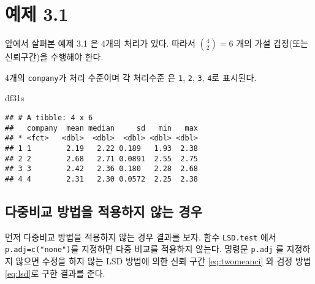 \documentclass[
]{book}
\newenvironment{Shaded}{\begin{snugshade}}{\end{snugshade}}
\newcommand{\AttributeTok}[1]{\textcolor[rgb]{0.77,0.63,0.00}{#1}}
\newcommand{\CommentTok}[1]{\textcolor[rgb]{0.56,0.35,0.01}{\textit{#1}}}
\newcommand{\ConstantTok}[1]{\textcolor[rgb]{0.00,0.00,0.00}{#1}}
\newcommand{\FloatTok}[1]{\textcolor[rgb]{0.00,0.00,0.81}{#1}}
\newcommand{\FunctionTok}[1]{\textcolor[rgb]{0.00,0.00,0.00}{#1}}
\newcommand{\NormalTok}[1]{#1}
\newcommand{\OtherTok}[1]{\textcolor[rgb]{0.56,0.35,0.01}{#1}}
\newcommand{\SpecialCharTok}[1]{\textcolor[rgb]{0.00,0.00,0.00}{#1}}
\newcommand{\StringTok}[1]{\textcolor[rgb]{0.31,0.60,0.02}{#1}}
\begin{document}
\hypertarget{uxc608uxc81c-3.1-1}{%
\section{예제 3.1}\label{uxc608uxc81c-3.1-1}}

앞에서 살펴본 예제 3.1 은 4개의 처리가 있다. 따라서 \({4 \choose 2} =6\)
개의 가설 검정(또는 신뢰구간)을 수행해야 한다.

4개의 \texttt{company}가 처리 수준이며 각 처리수준 은 \texttt{1}, \texttt{2}, \texttt{3}, \texttt{4}로 표시된다.

\begin{Shaded}
\begin{Highlighting}[]
\NormalTok{df31s}
\end{Highlighting}
\end{Shaded}

\begin{verbatim}
## # A tibble: 4 x 6
##   company  mean median     sd   min   max
## * <fct>   <dbl>  <dbl>  <dbl> <dbl> <dbl>
## 1 1        2.19   2.22 0.189   1.93  2.38
## 2 2        2.68   2.71 0.0891  2.55  2.75
## 3 3        2.42   2.36 0.180   2.28  2.68
## 4 4        2.31   2.30 0.0572  2.25  2.38
\end{verbatim}

\hypertarget{uxb2e4uxc911uxbe44uxad50-uxbc29uxbc95uxc744-uxc801uxc6a9uxd558uxc9c0-uxc54auxb294-uxacbduxc6b0}{%
\subsection{다중비교 방법을 적용하지 않는 경우}\label{uxb2e4uxc911uxbe44uxad50-uxbc29uxbc95uxc744-uxc801uxc6a9uxd558uxc9c0-uxc54auxb294-uxacbduxc6b0}}

먼저 다중비교 방법을 적용하지 않는 경우 결과를 보자. 함수 \texttt{LSD.test}
에서 \texttt{p.adj=c("none")}를 지정하면 다중 비교를 적용하지 않는다. 명령문
\texttt{p.adj} 를 지정하지 않으면 수정을 하지 않는 LSD 방법에 의한 신뢰 구간
\eqref{eq:twomeanci} 와 검정 방법 \eqref{eq:lsd}로 구한 결과를 준다.

\begin{Shaded}
\end{Shaded}
\end{document}
